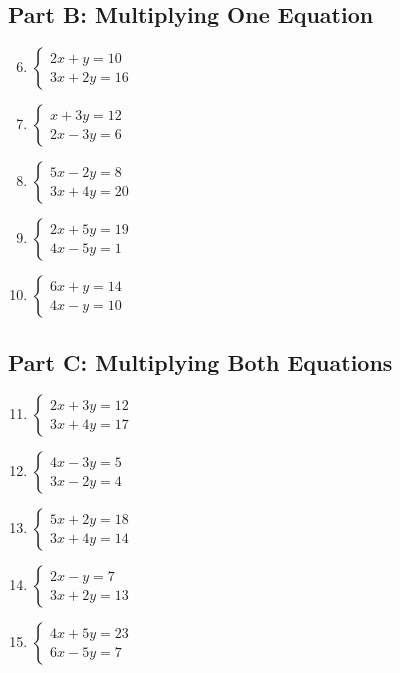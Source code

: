 \documentclass[14pt]{extarticle}
\begin{document}
\subsection*{Part B: Multiplying One Equation}
\begin{enumerate}
    \setcounter{enumi}{5}
    \item \(\begin{cases} 2x + y = 10 \\ 3x + 2y = 16 \end{cases}\)
    \item \(\begin{cases} x + 3y = 12 \\ 2x - 3y = 6 \end{cases}\)
    \item \(\begin{cases} 5x - 2y = 8 \\ 3x + 4y = 20 \end{cases}\)
    \item \(\begin{cases} 2x + 5y = 19 \\ 4x - 5y = 1 \end{cases}\)
    \item \(\begin{cases} 6x + y = 14 \\ 4x - y = 10 \end{cases}\)
\end{enumerate}

\subsection*{Part C: Multiplying Both Equations}
\begin{enumerate}
    \setcounter{enumi}{10}
    \item \(\begin{cases} 2x + 3y = 12 \\ 3x + 4y = 17 \end{cases}\)
    \item \(\begin{cases} 4x - 3y = 5 \\ 3x - 2y = 4 \end{cases}\)
    \item \(\begin{cases} 5x + 2y = 18 \\ 3x + 4y = 14 \end{cases}\)
    \item \(\begin{cases} 2x - y = 7 \\ 3x + 2y = 13 \end{cases}\)
    \item \(\begin{cases} 4x + 5y = 23 \\ 6x - 5y = 7 \end{cases}\)
\end{enumerate}
\end{document}
